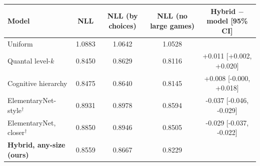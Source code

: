 \begin{tabular}{lcccc}
\toprule
Model & NLL & NLL (by choices) & NLL (no large games) & Hybrid $-$ model [95\% CI] \\
\midrule
Uniform & 1.0883 & 1.0642 & 1.0528 &  \\
Quantal level-$k$ & 0.8450 & 0.8629 & 0.8116 & +0.011 [+0.002, +0.020] \\
Cognitive hierarchy & 0.8475 & 0.8640 & 0.8145 & +0.008 [-0.000, +0.018] \\
ElementaryNet-style$^\dagger$ & 0.8931 & 0.8978 & 0.8594 & -0.037 [-0.046, -0.029] \\
ElementaryNet, closer$^\dagger$ & 0.8850 & 0.8946 & 0.8505 & -0.029 [-0.037, -0.022] \\
\textbf{Hybrid, any-size (ours)} & 0.8559 & 0.8667 & 0.8229 &  \\
\bottomrule
\end{tabular}
